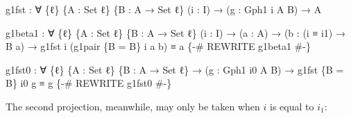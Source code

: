 \documentclass[
  12pt]{article}
\newenvironment{Shaded}{\begin{snugshade}}{\end{snugshade}}
\newcommand{\DataTypeTok}[1]{\textcolor[rgb]{0.00,0.34,0.68}{#1}}
\newcommand{\NormalTok}[1]{\textcolor[rgb]{0.12,0.11,0.11}{#1}}
\newcommand{\OtherTok}[1]{\textcolor[rgb]{0.00,0.43,0.16}{#1}}
\newcommand{\PreprocessorTok}[1]{\textcolor[rgb]{0.00,0.43,0.16}{#1}}
\begin{document}
\begin{Shaded}
\begin{Highlighting}[]
\NormalTok{    g1fst }\OtherTok{:} \OtherTok{∀} \OtherTok{\{}\NormalTok{ℓ}\OtherTok{\}} \OtherTok{\{}\NormalTok{A }\OtherTok{:} \DataTypeTok{Set}\NormalTok{ ℓ}\OtherTok{\}} \OtherTok{\{}\NormalTok{B }\OtherTok{:}\NormalTok{ A }\OtherTok{→} \DataTypeTok{Set}\NormalTok{ ℓ}\OtherTok{\}} \OtherTok{(}\NormalTok{i }\OtherTok{:}\NormalTok{ I}\OtherTok{)}
            \OtherTok{→} \OtherTok{(}\NormalTok{g }\OtherTok{:}\NormalTok{ Gph1 i A B}\OtherTok{)} \OtherTok{→}\NormalTok{ A}
    
\NormalTok{    g1beta1 }\OtherTok{:} \OtherTok{∀} \OtherTok{\{}\NormalTok{ℓ}\OtherTok{\}} \OtherTok{\{}\NormalTok{A }\OtherTok{:} \DataTypeTok{Set}\NormalTok{ ℓ}\OtherTok{\}} \OtherTok{\{}\NormalTok{B }\OtherTok{:}\NormalTok{ A }\OtherTok{→} \DataTypeTok{Set}\NormalTok{ ℓ}\OtherTok{\}} \OtherTok{(}\NormalTok{i }\OtherTok{:}\NormalTok{ I}\OtherTok{)}
              \OtherTok{→} \OtherTok{(}\NormalTok{a }\OtherTok{:}\NormalTok{ A}\OtherTok{)} \OtherTok{→} \OtherTok{(}\NormalTok{b }\OtherTok{:} \OtherTok{(}\NormalTok{i ≡ i1}\OtherTok{)} \OtherTok{→}\NormalTok{ B a}\OtherTok{)}
              \OtherTok{→}\NormalTok{ g1fst i }\OtherTok{(}\NormalTok{g1pair }\OtherTok{\{}\NormalTok{B }\OtherTok{=}\NormalTok{ B}\OtherTok{\}}\NormalTok{ i a b}\OtherTok{)}\NormalTok{ ≡ a}
    \PreprocessorTok{\{{-}\# REWRITE g1beta1 \#{-}\}}
    
\NormalTok{    g1fst0 }\OtherTok{:} \OtherTok{∀} \OtherTok{\{}\NormalTok{ℓ}\OtherTok{\}} \OtherTok{\{}\NormalTok{A }\OtherTok{:} \DataTypeTok{Set}\NormalTok{ ℓ}\OtherTok{\}} \OtherTok{\{}\NormalTok{B }\OtherTok{:}\NormalTok{ A }\OtherTok{→} \DataTypeTok{Set}\NormalTok{ ℓ}\OtherTok{\}}
             \OtherTok{→} \OtherTok{(}\NormalTok{g }\OtherTok{:}\NormalTok{ Gph1 i0 A B}\OtherTok{)} \OtherTok{→}\NormalTok{ g1fst }\OtherTok{\{}\NormalTok{B }\OtherTok{=}\NormalTok{ B}\OtherTok{\}}\NormalTok{ i0 g ≡ g}
    \PreprocessorTok{\{{-}\# REWRITE g1fst0 \#{-}\}}
\end{Highlighting}
\end{Shaded}

The second projection, meanwhile, may only be taken when \(i\) is equal
to \(i_1\):
\end{document}
